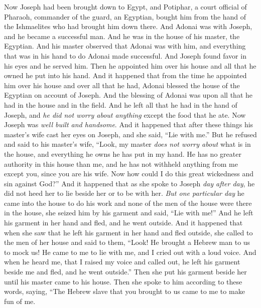 \begin{biblechapter} %
 Now Joseph had been brought down to Egypt, and Potiphar, a court official of Pharaoh, commander of the guard, an Egyptian, bought him from the hand of the Ishmaelites who had brought him down there.
\verse And Adonai was with Joseph, and he became a successful man. And he was in the house of his master, the Egyptian.
\verse And his master observed that Adonai was with him, and everything that was in his hand to do Adonai made successful.
\verse And Joseph found favor in his eyes and he served him. Then he appointed him over his house and all that he owned he put into his hand.
\verse And it happened that from the time he appointed him over his house and over all that he had, Adonai blessed the house of the Egyptian on account of Joseph. And the blessing of Adonai was upon all that he had in the house and in the field.
\verse And he left all that he had in the hand of Joseph, and \textit{he did not worry about anything} except the food that he ate. Now Joseph was \textit{well built and handsome}.
\verse And it happened that after these things his master’s wife cast her eyes on Joseph, and she said, “Lie with me.”
\verse But he refused and said to his master’s wife, “Look, my master \textit{does not worry about} what is in the house, and everything he owns he has put in my hand.
\verse He has no greater authority in this house than me, and he has not withheld anything from me except you, since you are his wife. Now how could I do this great wickedness and sin against God?”
\verse And it happened that as she spoke to Joseph \textit{day after day}, he did not heed her to lie beside her or to be with her.
\verse \textit{But one particular day} he came into the house to do his work and none of the men of the house were there in the house,
\verse she seized him by his garment and said, “Lie with me!” And he left his garment in her hand and fled, and he went outside.
\verse And it happened that when she saw that he left his garment in her hand and fled outside,
\verse she called to the men of her house and said to them, “Look! He brought a Hebrew man to us to mock us! He came to me to lie with me, and I cried out with a loud voice.
\verse And when he heard me, that I raised my voice and called out, he left his garment beside me and fled, and he went outside.”
\verse Then she put his garment beside her until his master came to his house.
\verse Then she spoke to him according to these words, saying, “The Hebrew slave that you brought to us came to me to make fun of me.

\end{biblechapter}
